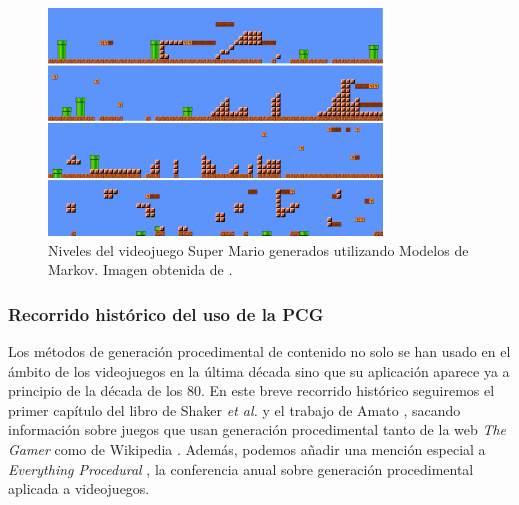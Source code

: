 \begin{figure}[H]
    \begin{center}
        \includegraphics[scale=0.775]{img/mario.png}
        \caption{Niveles del videojuego Super Mario generados utilizando Modelos de Markov. Imagen obtenida de \cite{snodgrass2017}.}
    \end{center}
\end{figure}


\subsubsection{Recorrido histórico del uso de la PCG}

Los métodos de generación procedimental de contenido no solo se han usado en el ámbito de los videojuegos en la última década sino que su aplicación aparece ya a principio de la década de los 80. En este breve recorrido histórico seguiremos el primer capítulo del libro de Shaker \textit{et al.} \cite{shaker2016} y el trabajo de Amato \cite{amato2017}, sacando información sobre juegos que usan generación procedimental tanto de la web \textit{The Gamer} \cite{glenn2021} como de Wikipedia \cite{listWiki}. Además, podemos añadir una mención especial a \textit{Everything Procedural} \cite{EP}, la conferencia anual sobre generación procedimental aplicada a videojuegos.

